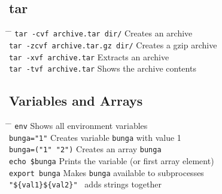 \documentclass[a4paper,10pt]{article}
\begin{document}
\subsection{tar}
\begin{tabbing}
	\= \hspace{30mm} \= \hspace{50mm} \kill
	\> \verb|tar -cvf archive.tar dir/| \> Creates an archive \\
	\> \verb|tar -zcvf archive.tar.gz dir/| \> Creates a gzip archive \\
	\> \verb|tar -xvf archive.tar| \> Extracts an archive \\
	\> \verb|tar -tvf archive.tar| \> Shows the archive contents \\
\end{tabbing}

\subsection{Variables and Arrays}
\begin{tabbing}
	\= \hspace{30mm} \= \hspace{50mm} \kill
	\> \verb|env| \> Shows all environment variables \\
	\> \verb|bunga="1"| \> Creates variable \verb|bunga| with value 1 \\
	\> \verb|bunga=("1" "2")| \> Creates an array \verb|bunga| \\
	\> \verb|echo $bunga| \> Prints the variable (or first array element) \\
	\> \verb|export bunga| \> Makes \verb|bunga| available to subprocesses \\
	\> \verb|"${val1}${val2}" | \> adds strings together \\
\end{tabbing}
\end{document}
